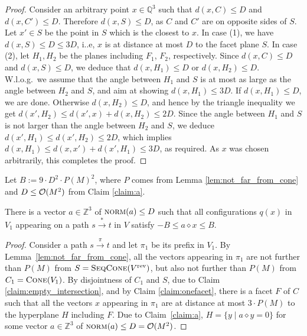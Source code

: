 \documentclass[a4paper, UKenglish, cleveref, autoref, thm-restate]{lipics-v2021}
\newcommand{\Z}{\mathbb{Z}}
\newcommand{\Q}{\mathbb{Q}}
\newcommand{\set}[1]{\{#1\}}
\newcommand{\setof}[2]{\set{#1 \mid #2}}
\newcommand{\trans}[1]{\stackrel{#1}{\longrightarrow}}
\newcommand{\tran}{\trans{*}}
\newcommand{\norm}{\textsc{norm}}
\newcommand{\OO}{{\cal O}}
\newcommand{\Wlog}{W.l.o.g.~}
\newcommand{\rev}[1]{{#1}^{\text{rev}}}
\newcommand{\cone}[1]{\textsc{Cone}(#1)}
\newcommand{\seqcone}[1]{\textsc{SeqCone}(#1)}
\newcommand{\innprod}[2]{#1 \diamond #2} \newcommand{\pair}[2]{#1_{#2}}
\begin{document}
\begin{appendixproof}
\begin{proof}
\noindent
Consider an arbitrary point $x\in\Q^3$ such that $d(x, C)\leq D$ and $d(x, C')\leq D$.
Therefore $d(x,S) \leq D$, as $C$ and $C'$ are on opposite sides of $S$.
Let $x'\in S$ be the point in $S$ which is the closest to $x$.
In case (1), we have $d(x,S)\leq D\leq 3D$, i..e, $x$ is at distance at most $D$ to the facet plane $S$.
In case (2), let $H_1, H_2$ be the planes including $F_1$, $F_2$, respectively.
Since $d(x, C)\leq D$ and $d(x,S) \leq D$, we deduce that $d(x,H_1)\leq D$ or $d(x,H_2)\leq D$.
\Wlog we assume that the angle between $H_1$ and $S$ is at most as large as the angle between $H_2$ and $S$,
and aim at showing $d(x, H_1) \leq 3D$.
If $d(x, H_1)\leq D$, we are done.
Otherwise $d(x, H_2) \leq D$, and hence by the triangle inequality we get
$d(x', H_2) \leq d(x', x) + d(x, H_2) \leq 2D$.
Since the angle between $H_1$ and $S$ is not larger than the angle between $H_2$ and $S$, 
we deduce $d(x', H_1) \leq d(x', H_2) \leq 2D$, which implies
$d(x, H_1)\leq d(x, x') + d(x', H_1) \leq 3D$, as required.
As $x$ was chosen arbitrarily, this completes the proof.
\end{proof}
Let $B:=9\cdot D^2 \cdot P(M)^2$, where $P$ comes from Lemma \ref{lem:not_far_from_cone} and
$D\leq \OO(M^2)$ from Claim \ref{claim:a}.
\begin{claim} \label{claim:axgen}
There is a vector $a\in\Z^3$ of $\norm(a)\leq D$ such that
all configurations $q(x)$ in $V_1$ appearing on a path $s\tran t$ in $V$ satisfy
$-B \leq \innprod a x \leq B$.
\end{claim}
\begin{proof}
Consider a path $s \trans{\pi} t$ and let $\pi_1$ be its prefix in $V_1$.
By Lemma~\ref{lem:not_far_from_cone}, all the vectors appearing in $\pi_1$ are not further than $P(M)$ from 
$S=\seqcone{\rev V}$, but also not further than $P(M)$ from $C_1 = \cone{V_1}$.
By disjointness of $C_1$ and $S$, due to Claim \ref{claim:empty_intersection}, 
and by Claim \ref{claim:onefacet},
there is a facet $F$ of $C$ such that
all the vectors $x$ appearing in $\pi_1$ are at distance at most  $3\cdot P(M)$ to
the hyperplane $H$ including $F$.
Due to Claim~\ref{claim:a}, $H=\setof{y}{\innprod {a} y = 0}$ for some
vector $a \in \Z^3$ of $\norm(a) \leq D=\OO(M^2)$.


\end{proof}
\end{appendixproof}
\end{document}
